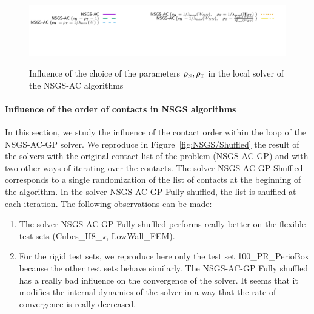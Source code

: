 \begin{figure}
{\includegraphics[height=\legendheight]{figure/NSGS/rho/1.0e-08/50/time/profile-Chain_legend.pdf}}
  \caption{Influence of the choice of the parameters $\rho_{\hbox{\tiny{N}}}, \rho_{\hbox{\tiny{T}}}$ in the local solver of the {\sf NSGS-AC} algorithms }
  \label{fig:NSGS/rho}
\end{figure}



\paragraph{Influence of the order of contacts  in NSGS algorithms}
In this section, we study the influence of the contact order within the loop of the {\sf NSGS-AC-GP} solver. We reproduce in Figure~\ref{fig:NSGS/Shuffled} the result of the solvers with the original contact list of the problem ({\sf NSGS-AC-GP}) and with two other ways of iterating over the contacts. The solver {\sf NSGS-AC-GP Shuffled} corresponds to a single randomization of the list of contacts at the beginning of the algorithm. In the solver  {\sf NSGS-AC-GP Fully shuffled}, the  list is shuffled at each iteration. The following observations can be made:
\begin{enumerate}
\item The solver  {\sf NSGS-AC-GP Fully shuffled} performs really better on the flexible test sets (Cubes\_H8\_$\star$, LowWall\_FEM).
\item For the rigid test sets, we reproduce here only the test set  100\_PR\_PerioBox because the other test sets behave similarly. The  {\sf NSGS-AC-GP Fully shuffled} has a really bad influence on the convergence of the solver. It seems that it modifies the internal dynamics of the solver in a way that the rate of convergence is really decreased.
\end{enumerate}

